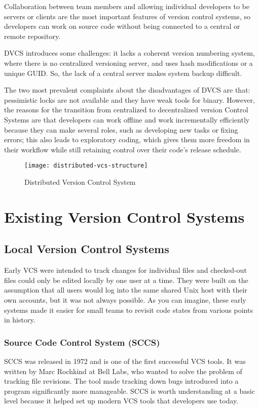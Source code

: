 Collaboration between team members and allowing individual developers to be servers or clients are the most important features of version control systems, so developers can work on source code without being connected to a central or remote repository.

DVCS introduces some challenges: it lacks a coherent version numbering system, where there is no centralized versioning server, and uses hash modifications or a unique GUID. So, the lack of a central server makes system backup difficult.

The two most prevalent complaints about the disadvantages of DVCS are that: pessimistic locks are not available and they have weak tools for binary. However, the reasons for the transition from centralized to decentralized version Control Systems are that developers can work offline and work incrementally efficiently because they can make several roles, such as developing new tasks or fixing errors; this also leads to exploratory coding, which gives them more freedom in their workflow while still retaining control over their code's release schedule.

\begin{figure}[htbp]
    \centering
    \texttt{[image: distributed-vcs-structure]}
    \caption{Distributed Version Control System}
    \label{fig:dvcs-structure}
\end{figure}


\section{Existing Version Control Systems}
\subsection{Local Version Control Systems}
Early VCS were intended to track changes for individual files and checked-out files could only be edited locally by one user at a time. They were built on the assumption that all users would log into the same shared Unix host with their own accounts, but it was not always possible. As you can imagine, these early systems made it easier for small teams to revisit code states from various points in history.
\subsubsection{Source Code Control System (SCCS)}
SCCS was released in 1972 and is one of the first successful VCS tools. It was written by Marc Rochkind at Bell Labs, who wanted to solve the problem of tracking file revisions. The tool made tracking down bugs introduced into a program significantly more manageable. SCCS is worth understanding at a basic level because it helped set up modern VCS tools that developers use today.
